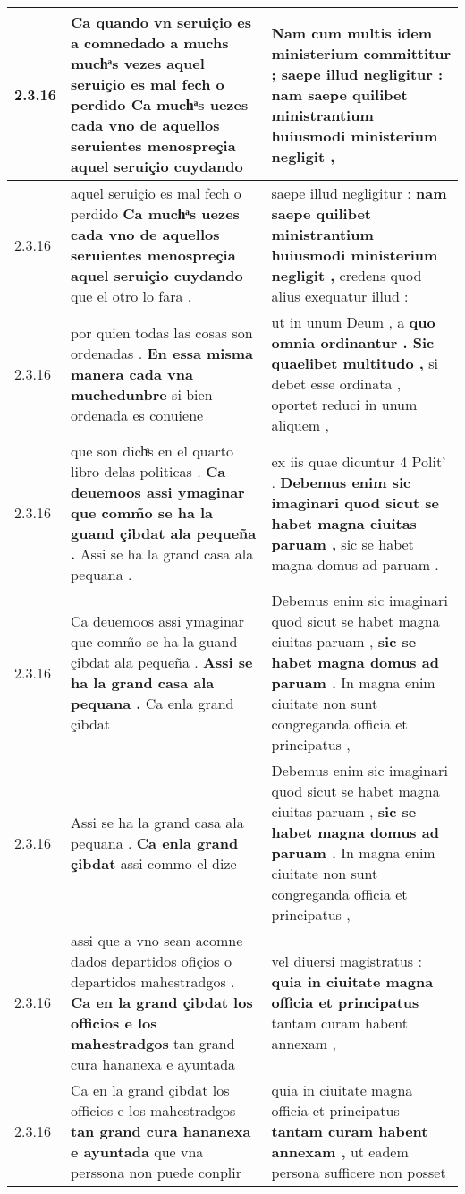 \begin{tabular}{|p{1cm}|p{6.5cm}|p{6.5cm}|}
2.3.16 & Ca quando vn seruiçio es a comnedado a muchs muchͣs vezes \textbf{ aquel seruiçio es mal fech o perdido } Ca muchͣs uezes cada vno de aquellos seruientes menospreçia aquel seruiçio cuydando & Nam cum multis idem ministerium committitur ; \textbf{ saepe illud negligitur : } nam saepe quilibet ministrantium huiusmodi ministerium negligit , \\\hline
2.3.16 & aquel seruiçio es mal fech o perdido \textbf{ Ca muchͣs uezes cada vno de aquellos seruientes menospreçia aquel seruiçio cuydando } que el otro lo fara . & saepe illud negligitur : \textbf{ nam saepe quilibet ministrantium huiusmodi ministerium negligit , } credens quod alius exequatur illud : \\\hline
2.3.16 & por quien todas las cosas son ordenadas . \textbf{ En essa misma manera cada vna muchedunbre } si bien ordenada es conuiene & ut in unum Deum , a \textbf{ quo omnia ordinantur . Sic quaelibet multitudo , } si debet esse ordinata , oportet reduci in unum aliquem , \\\hline
2.3.16 & que son dichͣs en el quarto libro delas politicas . \textbf{ Ca deuemoos assi ymaginar que comm̃o se ha la guand çibdat ala pequeña . } Assi se ha la grand casa ala pequana . & ex iis quae dicuntur 4 Polit’ . \textbf{ Debemus enim sic imaginari quod sicut se habet magna ciuitas paruam , } sic se habet magna domus ad paruam . \\\hline
2.3.16 & Ca deuemoos assi ymaginar que comm̃o se ha la guand çibdat ala pequeña . \textbf{ Assi se ha la grand casa ala pequana . } Ca enla grand çibdat & Debemus enim sic imaginari quod sicut se habet magna ciuitas paruam , \textbf{ sic se habet magna domus ad paruam . } In magna enim ciuitate non sunt congreganda officia et principatus , \\\hline
2.3.16 & Assi se ha la grand casa ala pequana . \textbf{ Ca enla grand çibdat } assi commo el dize & Debemus enim sic imaginari quod sicut se habet magna ciuitas paruam , \textbf{ sic se habet magna domus ad paruam . } In magna enim ciuitate non sunt congreganda officia et principatus , \\\hline
2.3.16 & assi que a vno sean acomne dados departidos ofiçios o departidos mahestradgos . \textbf{ Ca en la grand çibdat los officios e los mahestradgos } tan grand cura hananexa e ayuntada & vel diuersi magistratus : \textbf{ quia in ciuitate magna officia et principatus } tantam curam habent annexam , \\\hline
2.3.16 & Ca en la grand çibdat los officios e los mahestradgos \textbf{ tan grand cura hananexa e ayuntada } que vna perssona non puede conplir & quia in ciuitate magna officia et principatus \textbf{ tantam curam habent annexam , } ut eadem persona sufficere non posset \\\hline

\end{tabular}
